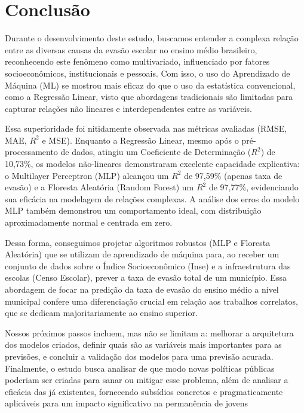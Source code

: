 \documentclass[english, spanish, brazilian]{RBIEarticle} %
\begin{document}
\newpage
\newpage

\section{Conclusão}
Durante o desenvolvimento deste estudo, buscamos entender a complexa relação entre as diversas causas da evasão escolar no ensino médio brasileiro, reconhecendo este fenômeno como multivariado, influenciado por fatores socioeconômicos, institucionais e pessoais. Com isso, o uso do Aprendizado de Máquina (ML) se mostrou mais eficaz do que o uso da estatística convencional, como a Regressão Linear, visto que abordagens tradicionais são limitadas para capturar relações não lineares e interdependentes entre as variáveis.

Essa superioridade foi nitidamente observada nas métricas avaliadas (RMSE, MAE, $R^2$ e MSE). Enquanto a Regressão Linear, mesmo após o pré-processamento de dados, atingiu um Coeficiente de Determinação ($R^2$) de 10,73\%, os modelos não-lineares demonstraram excelente capacidade explicativa: o Multilayer Perceptron (MLP) alcançou um $R^2$ de 97,59\% (apenas taxa de evasão) e a Floresta Aleatória (Random Forest) um $R^2$ de 97,77\%, evidenciando sua eficácia na modelagem de relações complexas. A análise dos erros do modelo MLP também demonstrou um comportamento ideal, com distribuição aproximadamente normal e centrada em zero.

Dessa forma, conseguimos projetar algoritmos robustos (MLP e Floresta Aleatória) que se utilizam de aprendizado de máquina para, ao receber um conjunto de dados sobre o Índice Socioeconômico (Inse) e a infraestrutura das escolas (Censo Escolar), prever a taxa de evasão total de um município. Essa abordagem de focar na predição da taxa de evasão do ensino médio a nível municipal confere uma diferenciação crucial em relação aos trabalhos correlatos, que se dedicam majoritariamente ao ensino superior.

Nossos próximos passos incluem, mas não se limitam a: melhorar a arquitetura dos modelos criados, definir quais são as variáveis mais importantes para as previsões, e concluir a validação dos modelos para uma previsão acurada. Finalmente, o estudo busca analisar de que modo novas políticas públicas poderiam ser criadas para sanar ou mitigar esse problema, além de analisar a eficácia das já existentes, fornecendo subsídios concretos e pragmaticamente aplicáveis para um impacto significativo na permanência de jovens
\end{document}
